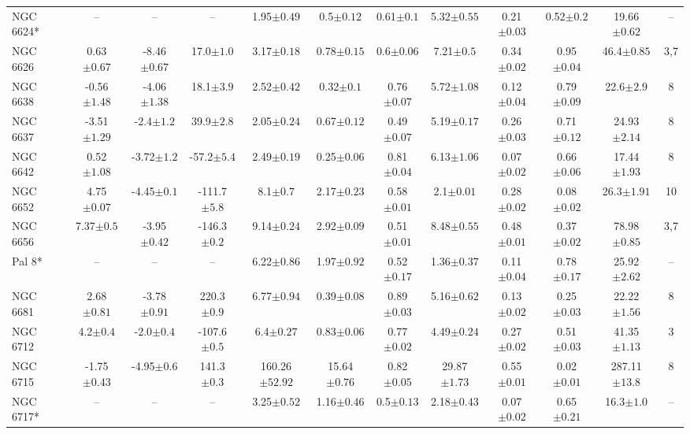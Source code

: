 \begin{landscape}
\begin{table}
\begin{tabular}{lccccccccccc}
NGC 6624* & -- & -- & -- & 1.95$\pm{0.49}$ & 0.5$\pm{0.12}$ & 0.61$\pm{0.1}$ & 5.32$\pm{0.55}$ & 0.21$\pm{0.03}$ & 0.52$\pm{0.2}$ & 19.66$\pm{0.62}$&-- \\ 
NGC 6626 & 0.63$\pm{0.67}$ & -8.46$\pm{0.67}$ & 17.0$\pm{1.0}$ & 3.17$\pm{0.18}$ & 0.78$\pm{0.15}$ & 0.6$\pm{0.06}$ & 7.21$\pm{0.5}$ & 0.34$\pm{0.02}$ & 0.95$\pm{0.04}$ & 46.4$\pm{0.85}$&3,7 \\ 
NGC 6638 & -0.56$\pm{1.48}$ & -4.06$\pm{1.38}$ & 18.1$\pm{3.9}$ & 2.52$\pm{0.42}$ & 0.32$\pm{0.1}$ & 0.76$\pm{0.07}$ & 5.72$\pm{1.08}$ & 0.12$\pm{0.04}$ & 0.79$\pm{0.09}$ & 22.6$\pm{2.9}$&8 \\ 
NGC 6637 & -3.51$\pm{1.29}$ & -2.4$\pm{1.2}$ & 39.9$\pm{2.8}$ & 2.05$\pm{0.24}$ & 0.67$\pm{0.12}$ & 0.49$\pm{0.07}$ & 5.19$\pm{0.17}$ & 0.26$\pm{0.03}$ & 0.71$\pm{0.12}$ & 24.93$\pm{2.14}$&8 \\ 
NGC 6642 & 0.52$\pm{1.08}$ & -3.72$\pm{1.2}$ & -57.2$\pm{5.4}$ & 2.49$\pm{0.19}$ & 0.25$\pm{0.06}$ & 0.81$\pm{0.04}$ & 6.13$\pm{1.06}$ & 0.07$\pm{0.02}$ & 0.66$\pm{0.06}$ & 17.44$\pm{1.93}$&8 \\ 
NGC 6652 & 4.75$\pm{0.07}$ & -4.45$\pm{0.1}$ & -111.7$\pm{5.8}$ & 8.1$\pm{0.7}$ & 2.17$\pm{0.23}$ & 0.58$\pm{0.01}$ & 2.1$\pm{0.01}$ & 0.28$\pm{0.02}$ & 0.08$\pm{0.02}$ & 26.3$\pm{1.91}$&10 \\ 
NGC 6656 & 7.37$\pm{0.5}$ & -3.95$\pm{0.42}$ & -146.3$\pm{0.2}$ & 9.14$\pm{0.24}$ & 2.92$\pm{0.09}$ & 0.51$\pm{0.01}$ & 8.48$\pm{0.55}$ & 0.48$\pm{0.01}$ & 0.37$\pm{0.02}$ & 78.98$\pm{0.85}$&3,7 \\ 
Pal 8* & -- & -- & -- & 6.22$\pm{0.86}$ & 1.97$\pm{0.92}$ & 0.52$\pm{0.17}$ & 1.36$\pm{0.37}$ & 0.11$\pm{0.04}$ & 0.78$\pm{0.17}$ & 25.92$\pm{2.62}$&-- \\ 
NGC 6681 & 2.68$\pm{0.81}$ & -3.78$\pm{0.91}$ & 220.3$\pm{0.9}$ & 6.77$\pm{0.94}$ & 0.39$\pm{0.08}$ & 0.89$\pm{0.03}$ & 5.16$\pm{0.62}$ & 0.13$\pm{0.02}$ & 0.25$\pm{0.03}$ & 22.22$\pm{1.56}$&8 \\ 
NGC 6712 & 4.2$\pm{0.4}$ & -2.0$\pm{0.4}$ & -107.6$\pm{0.5}$ & 6.4$\pm{0.27}$ & 0.83$\pm{0.06}$ & 0.77$\pm{0.02}$ & 4.49$\pm{0.24}$ & 0.27$\pm{0.02}$ & 0.51$\pm{0.03}$ & 41.35$\pm{1.13}$&3 \\ 
NGC 6715 & -1.75$\pm{0.43}$ & -4.95$\pm{0.6}$ & 141.3$\pm{0.3}$ & 160.26$\pm{52.92}$ & 15.64$\pm{0.76}$ & 0.82$\pm{0.05}$ & 29.87$\pm{1.73}$ & 0.55$\pm{0.01}$ & 0.02$\pm{0.01}$ & 287.11$\pm{13.8}$&8 \\ 
NGC 6717* & -- & -- & -- & 3.25$\pm{0.52}$ & 1.16$\pm{0.46}$ & 0.5$\pm{0.13}$ & 2.18$\pm{0.43}$ & 0.07$\pm{0.02}$ & 0.65$\pm{0.21}$ & 16.3$\pm{1.0}$&-- \\ 

\end{tabular}
\end{table}
\end{landscape}

